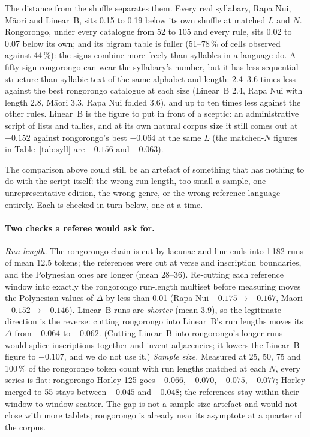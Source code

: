 \documentclass[11pt,a4paper]{article}
\begin{document}
The distance from the shuffle separates them. Every real syllabary, Rapa Nui, M\=aori and Linear~B, sits 0.15 to 0.19 below its own shuffle at matched $L$ and $N$. Rongorongo, under every catalogue from 52 to 105 and every rule, sits 0.02 to 0.07 below its own; and its bigram table is fuller (51--78\,\% of cells observed against 44\,\%): the signs combine more freely than syllables in a language do. A fifty-sign rongorongo can wear the syllabary's number, but it has less sequential structure than syllabic text of the same alphabet and length: 2.4--3.6 times less against the best rongorongo catalogue at each size (Linear~B 2.4, Rapa Nui with length 2.8, M\=aori 3.3, Rapa Nui folded 3.6), and up to ten times less against the other rules. Linear~B is the figure to put in front of a sceptic: an administrative script of lists and tallies, and at its own natural corpus size it still comes out at $-0.152$ against rongorongo's best $-0.064$ at the same $L$ (the matched-$N$ figures in Table~\ref{tab:syll} are $-0.156$ and $-0.063$).

The comparison above could still be an artefact of something that has nothing to do with the script itself: the wrong run length, too small a sample, one unrepresentative edition, the wrong genre, or the wrong reference language entirely. Each is checked in turn below, one at a time.

\paragraph{Two checks a referee would ask for.} \emph{Run length.} The rongorongo chain is cut by lacunae and line ends into 1\,182 runs of mean 12.5 tokens; the references were cut at verse and inscription boundaries, and the Polynesian ones are longer (mean 28--36). Re-cutting each reference window into exactly the rongorongo run-length multiset before measuring moves the Polynesian values of $\Delta$ by less than 0.01 (Rapa Nui $-0.175 \to -0.167$, M\=aori $-0.152 \to -0.146$). Linear~B runs are \emph{shorter} (mean 3.9), so the legitimate direction is the reverse: cutting rongorongo into Linear~B's run lengths moves its $\Delta$ from $-0.064$ to $-0.062$. (Cutting Linear~B into rongorongo's longer runs would splice inscriptions together and invent adjacencies; it lowers the Linear~B figure to $-0.107$, and we do not use it.) \emph{Sample size.} Measured at 25, 50, 75 and 100\,\% of the rongorongo token count with run lengths matched at each $N$, every series is flat: rongorongo Horley-125 goes $-0.066$, $-0.070$, $-0.075$, $-0.077$; Horley merged to 55 stays between $-0.045$ and $-0.048$; the references stay within their window-to-window scatter. The gap is not a sample-size artefact and would not close with more tablets; rongorongo is already near its asymptote at a quarter of the corpus.
\end{document}
